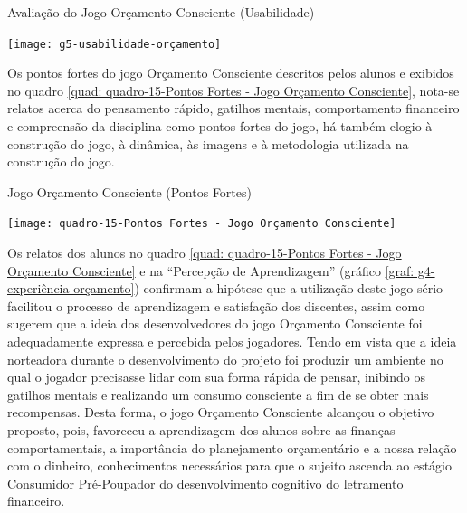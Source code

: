 \graphicspath{{graficos/}} 
\begin{grafico}[!ht]
\centering
\begin{minipage}{0.9\textwidth}
\caption{Avaliação do Jogo Orçamento Consciente (Usabilidade)}
\centering
\texttt{[image: g5-usabilidade-orçamento]}
\label{graf: g5-usabilidade-orçamento}
\end{minipage}
\end{grafico}

Os pontos fortes do jogo Orçamento Consciente descritos pelos alunos e exibidos no quadro \ref{quad: quadro-15-Pontos Fortes - Jogo Orçamento Consciente}, nota-se relatos acerca do pensamento rápido, gatilhos mentais, comportamento financeiro e compreensão da disciplina como pontos fortes do jogo, há também elogio à construção do jogo, à dinâmica, às imagens e à metodologia utilizada na construção do jogo.

\graphicspath{{quadros/}} 
\begin{quadro}[!ht]
\centering
\begin{minipage}{0.8\textwidth}
\caption{Jogo Orçamento Consciente (Pontos Fortes)}
\centering
\texttt{[image: quadro-15-Pontos Fortes - Jogo Orçamento Consciente]}
\label{quad: quadro-15-Pontos Fortes - Jogo Orçamento Consciente}
\end{minipage}
\end{quadro}

Os relatos dos alunos no quadro \ref{quad: quadro-15-Pontos Fortes - Jogo Orçamento Consciente} e na “Percepção de Aprendizagem” (gráfico \ref{graf: g4-experiência-orçamento}) confirmam a hipótese que a utilização deste jogo sério facilitou o processo de aprendizagem e satisfação dos discentes, assim como sugerem que a ideia dos desenvolvedores do jogo Orçamento Consciente foi adequadamente expressa e percebida pelos jogadores. Tendo em vista que a ideia norteadora durante o desenvolvimento do projeto foi produzir um ambiente no qual o jogador precisasse lidar com sua forma rápida de pensar, inibindo os gatilhos mentais e realizando um consumo consciente a fim de se obter mais recompensas. Desta forma, o jogo Orçamento Consciente alcançou o objetivo proposto, pois, favoreceu a aprendizagem dos alunos sobre as finanças comportamentais, a importância do planejamento orçamentário e a nossa relação com o dinheiro, conhecimentos necessários para que o sujeito ascenda ao estágio Consumidor Pré-Poupador do desenvolvimento cognitivo do letramento financeiro.

